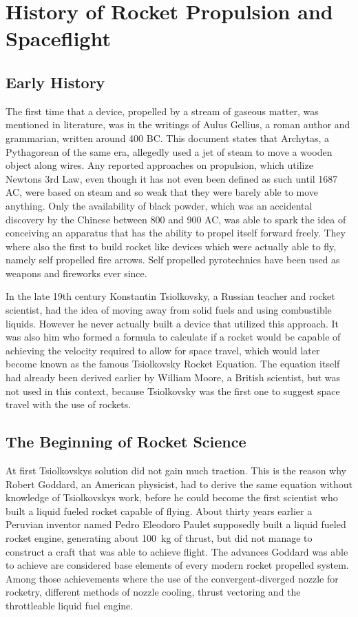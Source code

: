 \author{Sebastian Schaffler}
\section{History of Rocket Propulsion and Spaceflight}

\subsection{Early History}
The first time that a device, propelled by a stream of gaseous matter, was mentioned in literature, was in the writings of Aulus Gellius, a roman author and grammarian, written around 400 BC. This document states that Archytas, a Pythagorean of the same era, allegedly used a jet of steam to move a wooden object along wires. Any reported approaches on propulsion, which utilize Newtons 3rd Law, even though it has not even been defined as such until 1687 AC, were based on steam and so weak that they were barely able to move anything. Only the availability of black powder, which was an accidental discovery by the Chinese between 800 and 900 AC, was able to spark the idea of conceiving an apparatus that has the ability to propel itself forward freely. They where also the first to build rocket like devices which were actually able to fly, namely self propelled fire arrows. Self propelled pyrotechnics have been used as weapons and fireworks ever since. \cite{nasa-brief-history}

In the late 19th century Konstantin Tsiolkovsky, a Russian teacher and rocket scientist, had the idea of moving away from solid fuels and using combustible liquids. However he never actually built a device that utilized this approach. It was also him who formed a formula to calculate if a rocket would be capable of achieving the velocity required to allow for space travel, which would later become known as the famous Tsiolkovsky Rocket Equation. The equation itself had already been derived earlier by William Moore, a British scientist, but was not used in this context, because Tsiolkovsky was the first one to suggest space travel with the use of rockets.\cite{nasa-brief-history} \cite{rocket-equation-wiki}

\subsection{The Beginning of Rocket Science}

At first Tsiolkovskys solution did not gain much traction. This is the reason why Robert Goddard, an American physicist, had to derive the same equation without knowledge of Tsiolkovskys work, before he could become the first scientist who built a liquid fueled rocket capable of flying. About thirty years earlier a Peruvian inventor named Pedro Eleodoro Paulet supposedly built a liquid fueled rocket engine, generating about \SI{100}{\kilo\gram} of thrust, but did not manage to construct a craft that was able to achieve flight. The advances Goddard was able to achieve are considered base elements of every modern rocket propelled system. Among those achievements where the use of the convergent-diverged nozzle for rocketry, different methods of nozzle cooling, thrust vectoring and the throttleable liquid fuel engine.\cite{nasa-brief-history}

